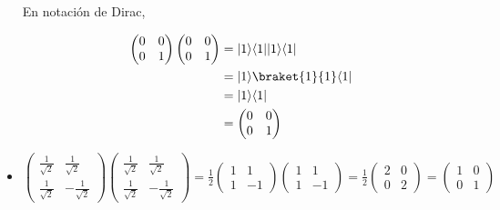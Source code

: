 \documentclass[osajnl,preprint,showpacs,superscriptaddress,10pt]{revtex4-1} %
\DeclarePairedDelimiter\bra{\langle}{\rvert}
\DeclarePairedDelimiter\ket{\lvert}{\rangle}
\begin{document}
\begin{itemize}
    En notación de Dirac,
    \begin{fleqn}[\parindent]
    \begin{equation}
    \begin{split}
        \begin{pmatrix}0 & 0 \\ 0 & 1\end{pmatrix}\begin{pmatrix}0 & 0\\ 0 & 1\end{pmatrix}
            &= \ket{1}\bra{1}\ket{1}\bra{1} \\
            &= \ket{1}\braket{1}{1}\bra{1} \\
            &= \ket{1}\bra{1} \\
            &= \begin{pmatrix}0 & 0\\ 0 & 1\end{pmatrix}
    \end{split}
    \end{equation}
    \end{fleqn}
    
    \item $\begin{pmatrix}\frac{1}{\sqrt{2}} & \frac{1}{\sqrt{2}} \\ \frac{1}{\sqrt{2}} & -\frac{1}{\sqrt{2}}\end{pmatrix}\begin{pmatrix}\frac{1}{\sqrt{2}} & \frac{1}{\sqrt{2}} \\ \frac{1}{\sqrt{2}} & -\frac{1}{\sqrt{2}}\end{pmatrix} = \frac{1}{2}\begin{pmatrix}1 & 1 \\ 1 & -1\end{pmatrix}\begin{pmatrix}1 & 1\\ 1 & -1\end{pmatrix} = \frac{1}{2}\begin{pmatrix}2 & 0 \\ 0 & 2\end{pmatrix} = \begin{pmatrix}1 & 0 \\ 0 & 1\end{pmatrix}$ \\
    

\end{itemize}
\end{document}

